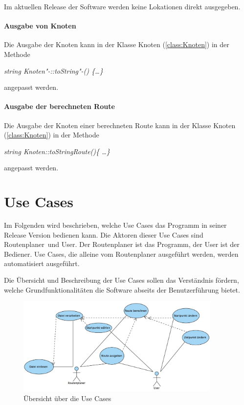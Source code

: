 \documentclass[12pt, a4paper, ngerman]{article}
\begin{document}
Im aktuellen Release der Software werden keine Lokationen direkt ausgegeben. 

\paragraph{Ausgabe von Knoten}
Die Ausgabe der Knoten kann in der Klasse Knoten (\ref{class:Knoten}) in der Methode 

\textit{string Knoten"-::toString"-() \{\dots \}} 

angepasst werden.

\paragraph{Ausgabe der berechneten Route}
Die Ausgabe der Knoten einer berechneten Route kann in der Klasse Knoten (\ref{class:Knoten}) in der Methode 

\textit{string Knoten::toStringRoute()\{ \dots \}} 

angepasst werden.


\section{Use Cases}
Im Folgenden wird beschrieben, welche Use Cases das Programm in seiner Release Version bedienen kann. Die Aktoren dieser Use Cases sind \glqq Routenplaner\grqq~und \glqq User\grqq. Der Routenplaner ist das Programm, der User ist der Bediener. Use Cases, die alleine vom Routenplaner ausgeführt werden, werden automatisiert ausgeführt.

Die Übersicht und Beschreibung der Use Cases sollen das Verständnis fördern, welche Grundfunktionalitäten die Software abseits der Benutzerführung bietet.

\begin{figure}[htbp] 
  \centering
     \includegraphics[width=0.9\textwidth]{Grafiken/primaryUseCases.jpg}
  \caption{Übersicht über die Use Cases}
  \label{fig:uebersichtUseCases}
\end{figure}
\end{document}
